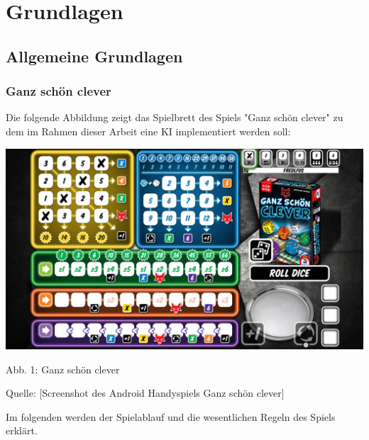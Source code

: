 \section{Grundlagen}
\subsection{Allgemeine Grundlagen}
\subsubsection{Ganz schön clever}
\begin{minipage}{\linewidth}
	Die folgende Abbildung zeigt das Spielbrett des Spiels "Ganz schön clever" zu dem im Rahmen dieser Arbeit eine KI implementiert werden soll:

	\vspace{0.5cm}
	\includegraphics[width=1\textwidth]{Bilder/gsc} 
	
	Abb. 1: Ganz schön clever 
	
	Quelle: [Screenshot des Android Handyspiels Ganz schön clever]\\
\end{minipage}

Im folgenden werden der Spielablauf und die wesentlichen Regeln des Spiels erklärt.


